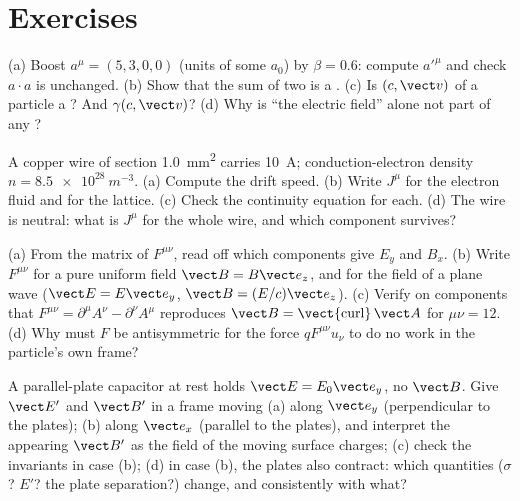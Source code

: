 \section{Exercises}

\begin{exercise}[$\star$]\label{exo:b3:covariant-electromagnetism:1}
(a) Boost $a^\mu = (5, 3, 0, 0)$ (units of some $a_0$) by $\beta =
0.6$: compute $a'^\mu$ and check $a\cdot a$ is unchanged. (b) Show
that the sum of two  is a . (c) Is $(c,
\vect v)$ of a particle a ? And $\gamma(c, \vect v)$? (d)
Why is ``the electric field'' alone not part of any ?
\end{exercise}

\begin{exercise}[$\star$]\label{exo:b3:covariant-electromagnetism:2}
A copper wire of section \qty{1.0}{mm^2} carries \qty{10}{A};
conduction-electron density $n = \qty{8.5e28}{m^{-3}}$. (a) Compute
the drift speed. (b) Write $J^\mu$ for the electron fluid and for the
lattice. (c) Check the continuity equation for each. (d) The wire is
neutral: what is $J^\mu$ for the whole wire, and which component
survives?
\end{exercise}

\begin{exercise}[$\star$]\label{exo:b3:covariant-electromagnetism:3}
(a) From the matrix of $F^{\mu\nu}$, read off which components give
$E_y$ and $B_x$. (b) Write $F^{\mu\nu}$ for a pure uniform field
$\vect B = B\vect e_z$, and for the field of a plane wave
($\vect E = E\vect e_y$, $\vect B = (E/c)\vect e_z$). (c) Verify on
components that $F^{\mu\nu} = \partial^\mu A^\nu - \partial^\nu
A^\mu$ reproduces $\vect B = \operatorname{\vect{curl}}\vect A$ for
$\mu\nu = 12$. (d) Why must $F$ be antisymmetric for the force
$qF^{\mu\nu}u_\nu$ to do no work in the particle's own frame?
\end{exercise}

\begin{exercise}[$\star$]\label{exo:b3:covariant-electromagnetism:4}
A parallel-plate capacitor at rest holds $\vect E = E_0\vect e_y$,
no $\vect B$. Give $\vect E'$ and $\vect B'$ in a frame moving (a)
along $\vect e_y$ (perpendicular to the plates); (b) along $\vect
e_x$ (parallel to the plates), and interpret the appearing $\vect B'$
as the field of the moving surface charges; (c) check the invariants
in case (b); (d) in case (b), the plates also contract: which
quantities ($\sigma$? $E'$? the plate separation?) change, and
consistently with what?
\end{exercise}

